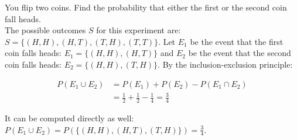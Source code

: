 \documentclass[12pt, a4paper]{article}
\newcounter{exa}
\begin{document}
\begin{texample}
You flip two coins. Find the probability that either the first or the second coin fall heads. \\

The possible outcomes $S$ for this experiment are: $S=\{(H, H), (H, T), (T, H), (T,T)\}$. Let $E_1$ be the event that the first coin falls heads: $E_1=\{(H, H), (H, T)\}$ and $E_2$ be the event that the second
coin falls heads: $E_2=\{(H, H), (T, H)\}$. By the inclusion-exclusion principle:

\begin{align*}
P(E_1 \cup E_2) &= P(E_1) + P(E_2) - P(E_1 \cap E_2) \\
&= \frac{1}{2}+\frac{1}{2}-\frac{1}{4}=\frac{3}{4}
\end{align*}

It can be computed directly as well: $P(E_1 \cup E_2)=P(\{(H, H), (H, T), (T, H)\})=\frac{3}{4}$.
\end{texample}
\end{document}
